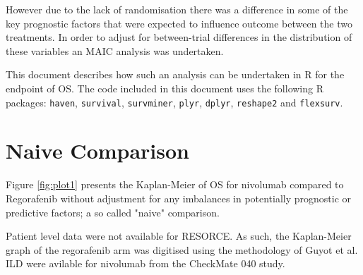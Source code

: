 \documentclass{article}\usepackage[]{graphicx}\usepackage[]{color}
\begin{document}
However due to the lack of randomisation there was a difference in some of the key prognostic factors that were expected to influence outcome between the two treatments.  In order to adjust for between-trial differences in the distribution of these variables an MAIC analysis was undertaken.

This document describes how such an analysis can be undertaken in R \cite{Rref1} for the endpoint of OS. The code included in this document uses the following R packages: \texttt{haven}, \texttt{survival}, \texttt{survminer}, \texttt{plyr}, \texttt{dplyr}, \texttt{reshape2} and
\texttt{flexsurv}.

\section{Naive Comparison}

Figure \ref{fig:plot1} presents the Kaplan-Meier of OS for nivolumab compared to Regorafenib without adjustment for any imbalances in potentially prognostic or predictive factors; a so called "naive" comparison.

Patient level data were not available for RESORCE. As such, the Kaplan-Meier graph of the regorafenib arm was digitised using the methodology of Guyot et al\cite{Guyot2012}. ILD were avilable for nivolumab from the CheckMate 040 study.
\end{document}
